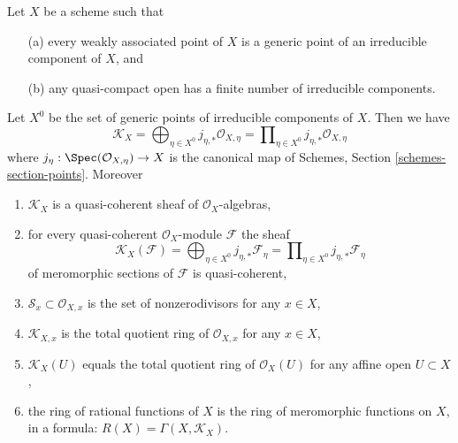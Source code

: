\begin{lemma}
\label{lemma-meromorphic-weakass-finite}
Let $X$ be a scheme such that
\begin{enumerate}
\item[(a)] every weakly associated point of $X$ is a generic point of an
irreducible component of $X$, and
\item[(b)] any quasi-compact open has a finite number of irreducible components.
\end{enumerate}
Let $X^0$ be the set of generic points of irreducible components of $X$.
Then we have
$$
\mathcal{K}_X =
\bigoplus\nolimits_{\eta \in X^0} j_{\eta, *}\mathcal{O}_{X, \eta} =
\prod\nolimits_{\eta \in X^0} j_{\eta, *}\mathcal{O}_{X, \eta}
$$
where $j_\eta : \Spec(\mathcal{O}_{X, \eta}) \to X$ is the canonical map
of Schemes, Section \ref{schemes-section-points}. Moreover
\begin{enumerate}
\item $\mathcal{K}_X$ is a quasi-coherent sheaf of
$\mathcal{O}_X$-algebras,
\item for every quasi-coherent $\mathcal{O}_X$-module $\mathcal{F}$ the sheaf
$$
\mathcal{K}_X(\mathcal{F}) =
\bigoplus\nolimits_{\eta \in X^0} j_{\eta, *}\mathcal{F}_\eta =
\prod\nolimits_{\eta \in X^0} j_{\eta, *}\mathcal{F}_\eta
$$
of meromorphic sections of $\mathcal{F}$
is quasi-coherent,
\item $\mathcal{S}_x \subset \mathcal{O}_{X, x}$
is the set of nonzerodivisors for any $x \in X$,
\item $\mathcal{K}_{X, x}$ is the total quotient ring of $\mathcal{O}_{X, x}$
for any $x \in X$,
\item $\mathcal{K}_X(U)$ equals the total quotient ring of $\mathcal{O}_X(U)$
for any affine open $U \subset X$,
\item the ring of rational functions of $X$ is the ring of meromorphic
functions on $X$, in a formula: $R(X) = \Gamma(X, \mathcal{K}_X)$.
\end{enumerate}
\end{lemma}

